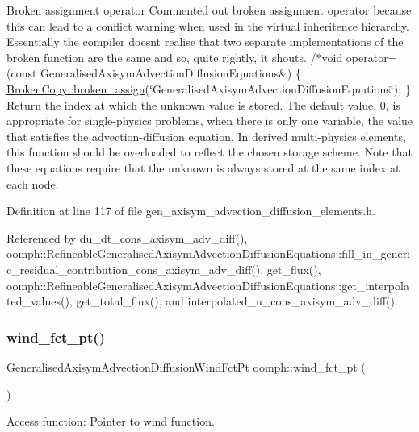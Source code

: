 Broken assignment operator Commented out broken assignment operator because this can lead to a conflict warning when used in the virtual inheritence hierarchy. Essentially the compiler doesn\textquotesingle{}t realise that two separate implementations of the broken function are the same and so, quite rightly, it shouts. /$\ast$void operator=(const Generalised\+Axisym\+Advection\+Diffusion\+Equations\&) \{ \hyperlink{namespaceoomph_1_1BrokenCopy_a32dc384e671e786bac0c67cbff701f45}{Broken\+Copy\+::broken\+\_\+assign}(\char`\"{}\+Generalised\+Axisym\+Advection\+Diffusion\+Equations\char`\"{}); \} Return the index at which the unknown value is stored. The default value, 0, is appropriate for single-\/physics problems, when there is only one variable, the value that satisfies the advection-\/diffusion equation. In derived multi-\/physics elements, this function should be overloaded to reflect the chosen storage scheme. Note that these equations require that the unknown is always stored at the same index at each node. 

Definition at line 117 of file gen\+\_\+axisym\+\_\+advection\+\_\+diffusion\+\_\+elements.\+h.



Referenced by du\+\_\+dt\+\_\+cons\+\_\+axisym\+\_\+adv\+\_\+diff(), oomph\+::\+Refineable\+Generalised\+Axisym\+Advection\+Diffusion\+Equations\+::fill\+\_\+in\+\_\+generic\+\_\+residual\+\_\+contribution\+\_\+cons\+\_\+axisym\+\_\+adv\+\_\+diff(), get\+\_\+flux(), oomph\+::\+Refineable\+Generalised\+Axisym\+Advection\+Diffusion\+Equations\+::get\+\_\+interpolated\+\_\+values(), get\+\_\+total\+\_\+flux(), and interpolated\+\_\+u\+\_\+cons\+\_\+axisym\+\_\+adv\+\_\+diff().

\mbox{\label{namespaceoomph_a09679a76034a175cfc8a098dda6621c1}} 
\subsubsection{\texorpdfstring{wind\+\_\+fct\+\_\+pt()}{wind\_fct\_pt()}}
{\footnotesize\ttfamily Generalised\+Axisym\+Advection\+Diffusion\+Wind\+Fct\+Pt oomph\+::wind\+\_\+fct\+\_\+pt (\begin{DoxyParamCaption}{ }\end{DoxyParamCaption})}



Access function\+: Pointer to wind function. 

